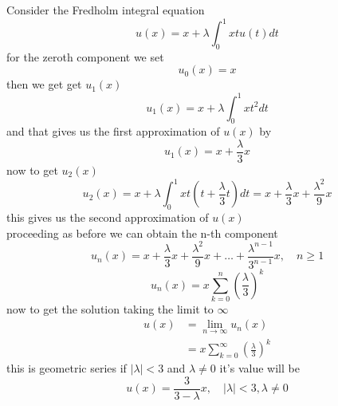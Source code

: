 \documentclass[]{article}
\begin{document}
\begin{example}
    Consider the Fredholm integral equation 
    \[
        u(x) = x + \lambda\int_{0}^{1} xt u(t)dt
    \]
    for the zeroth component we set 
    \[
    u_0(x) = x
    \]
    then we get get $u_1(x)$
    \[
        u_1(x) = x + \lambda\int_{0}^{1} xt^2dt
    \]
    and that gives us the first approximation of $u(x)$ by
    \[
        u_1(x) = x + \frac{\lambda}{3}x
    \]
    now to get $u_2(x)$
    \[
        u_2(x) = x + \lambda\int_{0}^{1} xt\left(t + \frac{\lambda}{3}t\right)dt = x +\frac{\lambda}{3} x +\frac{\lambda^2}{9} x
    \]
    this gives us the second approximation of $u(x)$
    \\
    proceeding as before we can obtain the n-th component
    \[
        u_n(x) = x +\frac{\lambda}{3} x +\frac{\lambda^2}{9} x + \dots + \frac{\lambda^{n-1}}{3^{n-1}} x , \quad n \geq 1
    \]
    \[
        u_n(x) = x\sum_{k=0}^{n} {\left(\frac{\lambda}{3}\right)}^{k}
    \]
    now to get the solution taking the limit to $\infty$
    \begin{align*}
        u(x) &= \lim_{n\to\infty} u_n(x)
        \\
        &= x\sum_{k=0}^{\infty} {\left(\frac{\lambda}{3}\right)}^{k}
    \end{align*}
    this is geometric series if $|\lambda| < 3$ and $\lambda \neq 0$ it's value will be 
    \[
    u(x) = \frac{3}{3-\lambda}x, \quad  |\lambda| < 3,\lambda \neq 0
    \]
\end{example}
\end{document}
